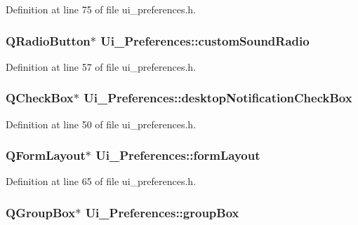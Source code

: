 Definition at line 75 of file ui\_\-preferences.h.

\hypertarget{classUi__Preferences_a14e5348186c9bd343b89528b172f51a1}{
\subsubsection[{customSoundRadio}]{\setlength{\rightskip}{0pt plus 5cm}QRadioButton$\ast$ {\bf Ui\_\-Preferences::customSoundRadio}}}
\label{classUi__Preferences_a14e5348186c9bd343b89528b172f51a1}


Definition at line 57 of file ui\_\-preferences.h.

\hypertarget{classUi__Preferences_aae955def2c42e4e1c34edf4c65004fe1}{
\subsubsection[{desktopNotificationCheckBox}]{\setlength{\rightskip}{0pt plus 5cm}QCheckBox$\ast$ {\bf Ui\_\-Preferences::desktopNotificationCheckBox}}}
\label{classUi__Preferences_aae955def2c42e4e1c34edf4c65004fe1}


Definition at line 50 of file ui\_\-preferences.h.

\hypertarget{classUi__Preferences_a7cc960abfea6a199c966a734c6cd7472}{
\subsubsection[{formLayout}]{\setlength{\rightskip}{0pt plus 5cm}QFormLayout$\ast$ {\bf Ui\_\-Preferences::formLayout}}}
\label{classUi__Preferences_a7cc960abfea6a199c966a734c6cd7472}


Definition at line 65 of file ui\_\-preferences.h.

\hypertarget{classUi__Preferences_a3cd5fd04e97e865d68cb74df58dd4a02}{
\subsubsection[{groupBox}]{\setlength{\rightskip}{0pt plus 5cm}QGroupBox$\ast$ {\bf Ui\_\-Preferences::groupBox}}}
\label{classUi__Preferences_a3cd5fd04e97e865d68cb74df58dd4a02}


